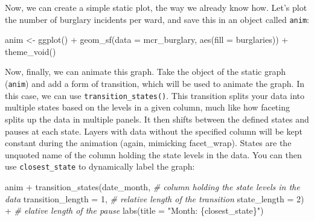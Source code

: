 \documentclass[
]{book}
\makeatletter
\newenvironment{Shaded}{\begin{snugshade}}{\end{snugshade}}
\newcommand{\AttributeTok}[1]{\textcolor[rgb]{0.61,0.61,0.61}{#1}}
\newcommand{\CommentTok}[1]{\textcolor[rgb]{0.37,0.37,0.37}{\textit{#1}}}
\newcommand{\DecValTok}[1]{\textcolor[rgb]{0.06,0.06,0.06}{#1}}
\newcommand{\FunctionTok}[1]{\textcolor[rgb]{0,0,0}{#1}}
\newcommand{\NormalTok}[1]{#1}
\newcommand{\OtherTok}[1]{\textcolor[rgb]{0.37,0.37,0.37}{#1}}
\newcommand{\SpecialCharTok}[1]{\textcolor[rgb]{0,0,0}{#1}}
\newcommand{\StringTok}[1]{\textcolor[rgb]{0.5,0.5,0.5}{#1}}
\newenvironment{kframe}{%
\medskip{}
\setlength{\fboxsep}{.8em}
 \def\at@end@of@kframe{}%
 \ifinner\ifhmode%
  \def\at@end@of@kframe{\end{minipage}}%
  \begin{minipage}{\columnwidth}%
 \fi\fi%
 \def\FrameCommand##1{\hskip\@totalleftmargin \hskip-\fboxsep
 \colorbox{shadecolor}{##1}\hskip-\fboxsep
     \hskip-\linewidth \hskip-\@totalleftmargin \hskip\columnwidth}%
 \MakeFramed {\advance\hsize-\width
   \@totalleftmargin\z@ \linewidth\hsize
   \@setminipage}}%
 {\par\unskip\endMakeFramed%
 \at@end@of@kframe}
\renewenvironment{Shaded}{\begin{kframe}}{\end{kframe}}
\makeatother
\begin{document}
Now, we can create a simple static plot, the way we already know how. Let's plot the number of burglary incidents per ward, and save this in an object called \texttt{anim}:

\begin{Shaded}
\begin{Highlighting}[]
\NormalTok{anim }\OtherTok{\textless{}{-}} \FunctionTok{ggplot}\NormalTok{() }\SpecialCharTok{+}
  \FunctionTok{geom\_sf}\NormalTok{(}\AttributeTok{data =}\NormalTok{ mcr\_burglary, }
          \FunctionTok{aes}\NormalTok{(}\AttributeTok{fill =}\NormalTok{ burglaries)) }\SpecialCharTok{+} 
  \FunctionTok{theme\_void}\NormalTok{()}
\end{Highlighting}
\end{Shaded}

Now, finally, we can animate this graph. Take the object of the static graph (\texttt{anim}) and add a form of transition, which will be used to animate the graph. In this case, we can use \texttt{transition\_states()}. This transition splits your data into multiple states based on the levels in a given column, much like how faceting splits up the data in multiple panels. It then shifts between the defined states and pauses at each state. Layers with data without the specified column will be kept constant during the animation (again, mimicking facet\_wrap). States are the unquoted name of the column holding the state levels in the data. You can then use \texttt{closest\_state} to dynamically label the graph:

\begin{Shaded}
\begin{Highlighting}[]
\NormalTok{anim }\SpecialCharTok{+} 
  \FunctionTok{transition\_states}\NormalTok{(date\_month,  }\CommentTok{\# column holding the state levels in the data}
                    \AttributeTok{transition\_length =} \DecValTok{1}\NormalTok{, }\CommentTok{\# relative length of the transition}
                    \AttributeTok{state\_length =} \DecValTok{2}\NormalTok{) }\SpecialCharTok{+} \CommentTok{\# elative length of the pause }
  \FunctionTok{labs}\NormalTok{(}\AttributeTok{title =} \StringTok{"Month: \{closest\_state\}"}\NormalTok{)}
\end{Highlighting}
\end{Shaded}
\end{document}
